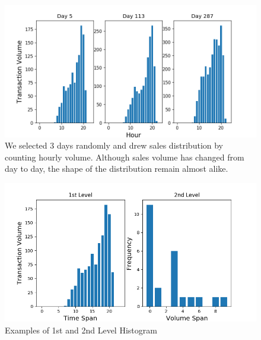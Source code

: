 \documentclass[10pt,conference,letterpaper]{article}
\begin{document}
		\begin{figure}[!t]
			\centering
			\includegraphics[width=.7\linewidth]{fig/SaleDistributions.png}
			\caption{We selected 3 days randomly and drew sales distribution by counting hourly volume. Although sales volume has changed from day to day, the shape of the distribution remain almost alike.}
			\label{fig:sale-distribution-sample}
		\end{figure}
		
		\begin{figure}[!t]
			\centering
			\includegraphics[width=\linewidth]{fig/HistogramExample.png}
			\caption{Examples of 1st and 2nd Level Histogram}
			\label{fig:histogram-example}
		\end{figure}
		
\end{document}
